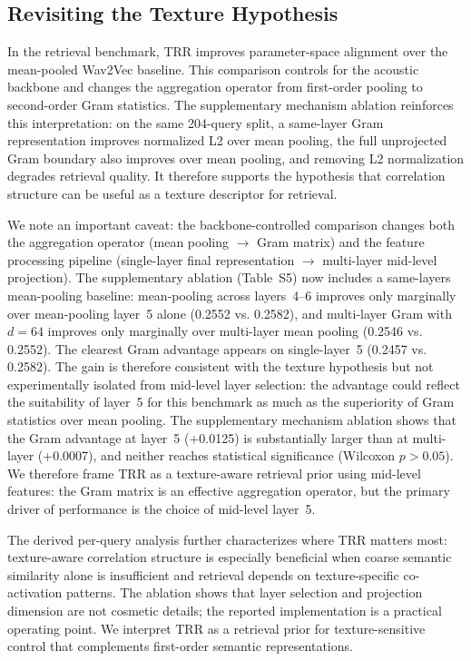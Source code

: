 \subsection{Revisiting the Texture Hypothesis}

In the retrieval benchmark, TRR improves parameter-space alignment over the mean-pooled Wav2Vec baseline. This comparison controls for the acoustic backbone and changes the aggregation operator from first-order pooling to second-order Gram statistics. The supplementary mechanism ablation reinforces this interpretation: on the same 204-query split, a same-layer Gram representation improves normalized L2 over mean pooling, the full unprojected Gram boundary also improves over mean pooling, and removing L2 normalization degrades retrieval quality. It therefore supports the hypothesis that correlation structure can be useful as a texture descriptor for retrieval.

We note an important caveat: the backbone-controlled comparison changes both the aggregation operator (mean pooling $\rightarrow$ Gram matrix) and the feature processing pipeline (single-layer final representation $\rightarrow$ multi-layer mid-level projection). The supplementary ablation (Table~S5) now includes a same-layers mean-pooling baseline: mean-pooling across layers~4--6 improves only marginally over mean-pooling layer~5 alone (0.2552 vs. 0.2582), and multi-layer Gram with $d=64$ improves only marginally over multi-layer mean pooling (0.2546 vs. 0.2552). The clearest Gram advantage appears on single-layer~5 (0.2457 vs. 0.2582). The gain is therefore consistent with the texture hypothesis but not experimentally isolated from mid-level layer selection: the advantage could reflect the suitability of layer~5 for this benchmark as much as the superiority of Gram statistics over mean pooling. The supplementary mechanism ablation shows that the Gram advantage at layer~5 (+0.0125) is substantially larger than at multi-layer (+0.0007), and neither reaches statistical significance (Wilcoxon $p > 0.05$). We therefore frame TRR as a texture-aware retrieval prior using mid-level features: the Gram matrix is an effective aggregation operator, but the primary driver of performance is the choice of mid-level layer~5.

The derived per-query analysis further characterizes where TRR matters most: texture-aware correlation structure is especially beneficial when coarse semantic similarity alone is insufficient and retrieval depends on texture-specific co-activation patterns. The ablation shows that layer selection and projection dimension are not cosmetic details; the reported implementation is a practical operating point. We interpret TRR as a retrieval prior for texture-sensitive control that complements first-order semantic representations.

